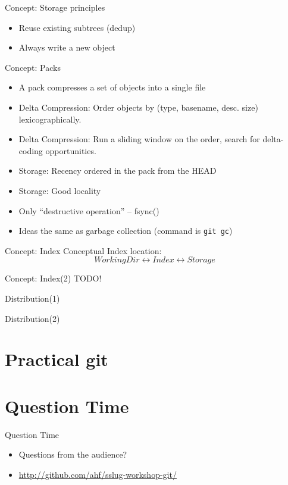 \documentclass[xcolor=pdftex,dvipsnames]{beamer}
\begin{document}
\begin{frame}{Concept: Storage principles}
  \begin{itemize}
  \item Reuse existing subtrees (dedup)
  \item Always write a new object
  \end{itemize}
\end{frame}
\begin{frame}{Concept: Packs}
  \begin{itemize}
  \item A pack compresses a set of objects into a single file
  \item Delta Compression: Order objects by (type, basename,
    desc. size) lexicographically.
  \item Delta Compression: Run a sliding window on the order, search
    for delta-coding opportunities.
  \item Storage: Recency ordered in the pack from the HEAD
  \item Storage: Good locality
  \item Only ``destructive operation'' -- fsync()
  \item Ideas the same as garbage collection (command is \texttt{git gc})
  \end{itemize}
\end{frame}
\begin{frame}{Concept: Index}
Conceptual Index location:
$$
  WorkingDir \leftrightarrow Index \leftrightarrow Storage
$$
\end{frame}
\begin{frame}{Concept: Index(2)}
  TODO!
\end{frame}
\begin{frame}{Distribution(1)}\end{frame}
\begin{frame}{Distribution(2)}\end{frame}

\section{Practical git}

\section{Question Time}
\begin{frame}{Question Time}
    \begin{itemize}
        \item Questions from the audience?
        \item \url{http://github.com/ahf/sslug-workshop-git/}
    \end{itemize}
\end{frame}
\end{document}
